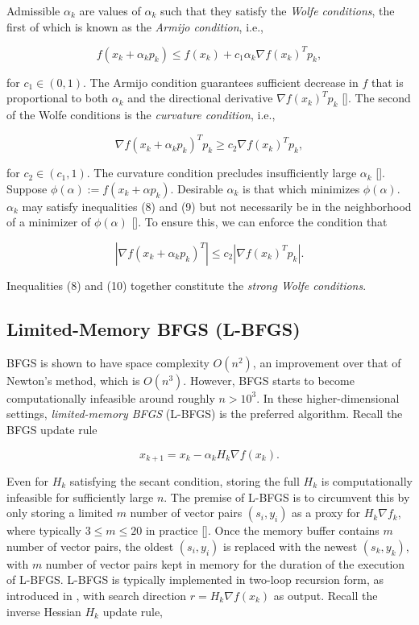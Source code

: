 \documentclass[twoside,11pt]{article}
\begin{document}
\noindent
Admissible $\alpha_k$ are values of $\alpha_k$ such that they satisfy the \textit{Wolfe conditions}, the first of which is known as the \textit{Armijo condition}, i.e., 

\begin{equation}
f(x_k + \alpha_k p_k) \leq f(x_k) + c_1\alpha_k \nabla f(x_k)^Tp_k,
\end{equation}

\noindent
for $c_1 \in (0,1)$. The Armijo condition guarantees sufficient decrease in $f$ that is proportional to both $\alpha_k$ and the directional derivative $\nabla f(x_k)^Tp_k$ [\cite{NW06}]. The second of the Wolfe conditions is the \textit{curvature condition}, i.e.,

\begin{equation}
\nabla f(x_k + \alpha_k p_k)^T p_k \geq c_2 \nabla f(x_k)^T p_k,
\end{equation}

\noindent
for $c_2 \in (c_1, 1)$. The curvature condition precludes insufficiently large $\alpha_k$ [\cite{NW06}]. Suppose $\phi(\alpha) := f(x_k + \alpha p_k)$. Desirable $\alpha_k$ is that which minimizes $\phi(\alpha)$. $\alpha_k$ may satisfy inequalities (8) and (9) but not necessarily be in the neighborhood of a minimizer of $\phi(\alpha)$ [\cite{NW06}]. To ensure this, we can enforce the condition that 

\begin{equation}
|\nabla f(x_k + \alpha_k p_k)^T| \leq c_2 |\nabla f(x_k)^T p_k|.
\end{equation}

\noindent
Inequalities (8) and (10) together constitute the \textit{strong Wolfe conditions}.

\subsection{Limited-Memory BFGS (L-BFGS)}

BFGS is shown to have space complexity $O(n^2)$, an improvement over that of Newton's method, which is $O(n^3)$. However, BFGS starts to become computationally infeasible around roughly $n > 10^3$. In these higher-dimensional settings, \textit{limited-memory BFGS} (L-BFGS) is the preferred algorithm. Recall the BFGS update rule

\begin{equation}
x_{k+1} = x_k - \alpha_k H_k \nabla f(x_k).
\end{equation}

\noindent
Even for $H_k$ satisfying the secant condition, storing the full $H_k$ is computationally infeasible for sufficiently large $n$. The premise of L-BFGS is to circumvent this by only storing a limited $m$ number of vector pairs $(s_i, y_i)$ as a proxy for $H_k \nabla f_k$, where typically $3 \leq m \leq 20$ in practice [\cite{NW06}]. Once the memory buffer contains $m$ number of vector pairs, the oldest $(s_i, y_i)$ is replaced with the newest $(s_k, y_k)$, with $m$ number of vector pairs kept in memory for the duration of the execution of L-BFGS. L-BFGS is typically implemented in two-loop recursion form, as introduced in \cite{LN89}, with search direction $r = H_k \nabla f(x_k)$ as output. Recall the inverse Hessian $H_k$ update rule,
\end{document}
